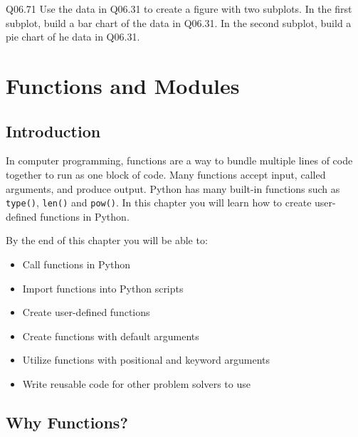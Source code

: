\documentclass{book}
\newcommand{\passthrough}[1]{#1}
\begin{document}
Q06.71 Use the data in Q06.31 to create a figure with two subplots. In
the first subplot, build a bar chart of the data in Q06.31. In the
second subplot, build a pie chart of he data in Q06.31.
    




    
        \hypertarget{functions-and-modules}{%
\chapter{Functions and Modules}\label{functions-and-modules}}
    




    
        \hypertarget{introduction}{%
\section{Introduction}\label{introduction}}
    




    
        In computer programming, functions are a way to bundle multiple lines of
code together to run as one block of code. Many functions accept input,
called arguments, and produce output. Python has many built-in functions
such as \passthrough{\lstinline!type()!},
\passthrough{\lstinline!len()!} and \passthrough{\lstinline!pow()!}. In
this chapter you will learn how to create user-defined functions in
Python.

By the end of this chapter you will be able to:

\begin{itemize}
\item
  Call functions in Python
\item
  Import functions into Python scripts
\item
  Create user-defined functions
\item
  Create functions with default arguments
\item
  Utilize functions with positional and keyword arguments
\item
  Write reusable code for other problem solvers to use
\end{itemize}
        \newpage

    




    
        \hypertarget{why-functions}{%
\section{Why Functions?}\label{why-functions}}
    
\end{document}
